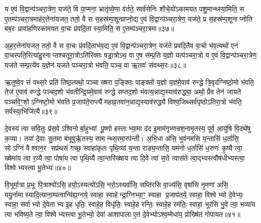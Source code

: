 य ए॒वं वि॒द्वान्प॑ञ्चरा॒त्रेण॒ यज॑ते॒ वि पा॒प्मना॒ भ्रातृ॑व्ये॒णा व॑र्तते॒ सार्व॑सेनिः शौचे॒यो॑ऽकामयत पशु॒मान्थ्स्या॒मिति॒ स ए॒तम्प॑ञ्चरा॒त्रमाह॑र॒त्तेना॑यजत॒ ततो॒ वै स स॒हस्र॑म्प॒शून्प्राप्नो॒द्य ए॒वं वि॒द्वान्प॑ञ्चरा॒त्रेण॒ यज॑ते॒ प्र स॒हस्र॑म्प॒शूनाप्नोति बब॒रः प्रावा॑हणिरकामयत वा॒चः प्र॑वदि॒ता स्या॒मिति॒ स ए॒तम्प॑ञ्चरा॒त्रमा॥३७॥

अ॒ह॒र॒त्तेना॑यजत॒ ततो॒ वै स वा॒चः प्र॑वदि॒ताभ॑व॒द्य ए॒वं वि॒द्वान्प॑ञ्चरा॒त्रेण॒ यज॑ते प्रवदि॒तैव वा॒चो भ॑व॒त्यथो॑ एनं वा॒चस्पति॒रित्या॑हु॒रनाप्तश्चतूरा॒त्रोऽति॑रिक्तः षड्रा॒त्रोऽथ॒ वा ए॒ष स॑म्प्र॒ति य॒ज्ञो यत्प॑ञ्चरा॒त्रो य ए॒वं वि॒द्वान्प॑ञ्चरा॒त्रेण॒ यज॑ते सम्प्र॒त्ये॑व य॒ज्ञेन॑ यजते पञ्चरा॒त्रो भ॑वति॒ पञ्च॒ वा ऋ॒तवः॑ संवथ्स॒रः॥३८॥

ऋ॒तुष्वे॒व सं॑ वथ्स॒रे प्रति॑ तिष्ठ॒त्यथो॒ पञ्चाख्षरा प॒ङ्क्तिः पाङ्क्तो॑ य॒ज्ञो य॒ज्ञमे॒वाव॑ रुन्द्धे त्रि॒वृद॑ग्निष्टो॒मो भ॑वति॒ तेज॑ ए॒वाव॑ रुन्द्धे पञ्चद॒शो भ॑वतीन्द्रि॒यमे॒वाव॑ रुन्द्धे सप्तद॒शो भ॑वत्य॒न्नाद्य॒स्याव॑रुद्ध्या॒ अथो॒ प्रैव तेन॑ जायते पञ्चवि॒ꣳ॒शोऽग्निष्टो॒मो भ॑वति प्र॒जाप॑ते॒राप्त्यै॑ महाव्र॒तवा॑न॒न्नाद्य॒स्याव॑रुद्ध्यै विश्व॒जिथ्सर्व॑पृष्ठोऽतिरा॒त्रो भ॑वति॒ सर्व॑स्या॒भिजि॑त्यै॥३९॥

{\anuvakamend[{ते व्याव॑र्तन्त प्रवदि॒ता स्या॒मिति॒ स ए॒तम्प़॑ञ्चरा॒त्रमा सं॑ वथ्स॒रो॑ऽभिजि॑त्यै॥10॥}]}

दे॒वस्य॑ त्वा सवि॒तुः प्र॑स॒वेऽश्विनोर्बा॒हुभ्यां पू॒ष्णो हस्ताभ्या॒मा द॑द इ॒माम॑गृभ्णन्रश॒नामृ॒तस्य॒ पूर्व॒ आयु॑षि वि॒दथे॑षु क॒व्या। तया॑ दे॒वाः सु॒तमा ब॑भूवुर्\mbox{}ऋ॒तस्य॒ सामन्थ्स॒रमा॒रप॑न्ती। अ॒भि॒धा अ॑सि॒ भुव॑नमसि य॒न्तासि॑ ध॒र्तासि॒ सोऽग्निं वैश्वान॒र सप्र॑थसं गच्छ॒ स्वाहा॑कृतः पृथि॒व्यां य॒न्ता राड्य॒न्तासि॒ यम॑नो ध॒र्तासि॑ ध॒रुणः॑ कृ॒ष्यै त्वा॒ ख्षेमा॑य त्वा र॒य्यै त्वा॒ पोषा॑य त्वा पृथि॒व्यै त्वा॒न्तरि॑ख्षाय त्वा दि॒वे त्वा॑ स॒ते त्वास॑ते त्वा॒द्भ्यस्त्वौष॑धीभ्यस्त्वा॒ विश्वेभ्यस्त्वा भू॒तेभ्यः॑॥४०॥

{\anuvakamend[{ध॒रुणः॒ प़ञ्च॑विशतिश्च॥11॥}]}

वि॒भूर्मा॒त्रा प्र॒भूः पि॒त्राश्वो॑ऽसि॒ हयो॒ऽस्यत्यो॑ऽसि॒ नरो॒ऽस्यर्वा॑सि॒ सप्ति॑रसि वा॒ज्य॑सि॒ वृषा॑सि नृ॒मणा॑ असि॒ ययु॒र्नामास्यादि॒त्याना॒म्पत्वान्वि॑ह्य॒ग्नये॒ स्वाहा॒ स्वाहेन्द्रा॒ग्निभ्या॒ꣳ॒ स्वाहा प्र॒जाप॑तये॒ स्वाहा॒ विश्वेभ्यो दे॒वेभ्यः॒ स्वाहा॒ सर्वाभ्यो दे॒वेताभ्य इ॒ह धृतिः॒ स्वाहे॒ह विधृ॑तिः॒ स्वाहे॒ह रन्तिः॒ स्वाहे॒ह रम॑तिः॒ स्वाहा॒ भूर॑सि भु॒वे त्वा॒ भव्या॑य त्वा भविष्य॒ते त्वा॒ विश्वेभ्यस्त्वा भू॒तेभ्यो॒ देवा॑ आशापाला ए॒तं दे॒वेभ्योऽश्व॒म्मेधा॑य॒ प्रोख्षि॑तं गोपायत॥४१॥


